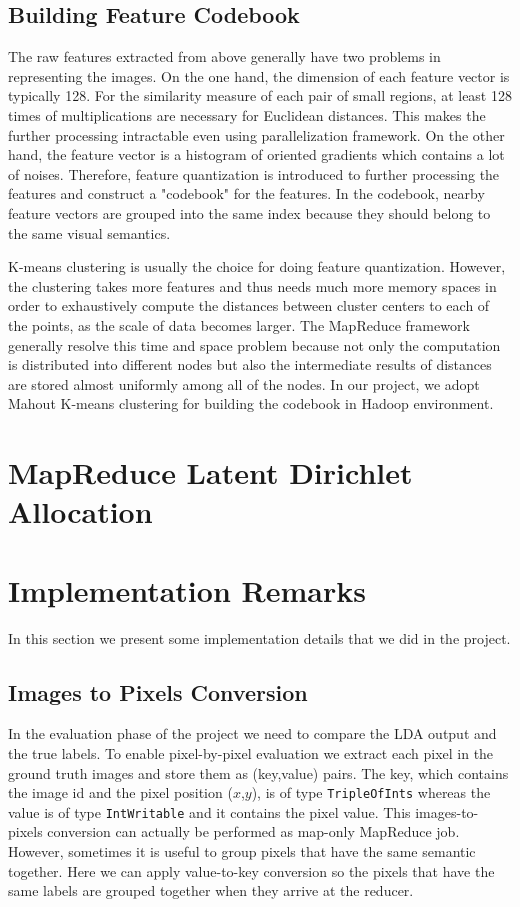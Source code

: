 \documentclass{sig-alternate}
\begin{document}
\subsection{Building Feature Codebook}
The raw features extracted from above generally have two problems in representing the images. On the one hand, the dimension of each feature vector is typically 128. For the similarity measure of each pair of small regions, at least 128 times of multiplications are necessary for Euclidean distances. This makes the further processing intractable even using parallelization framework. On the other hand, the feature vector is a histogram of oriented gradients which contains a lot of noises. Therefore, feature quantization is introduced to further processing the features and construct a "codebook" for the features. In the codebook, nearby feature vectors are grouped into the same index because they should belong to the same visual semantics.

K-means clustering is usually the choice for doing feature quantization. However, the clustering takes more features and thus needs much more memory spaces in order to exhaustively compute the distances between cluster centers to each of the points, as the scale of data becomes larger. The MapReduce framework generally resolve this time and space problem because not only the computation is distributed into different nodes but also the intermediate results of distances are stored almost uniformly among all of the nodes. In our project, we adopt Mahout K-means clustering \cite{mahout} for building the codebook in Hadoop environment.
\section{MapReduce Latent Dirichlet Allocation}\label{sec:mrlda}
\cite{mrlda}

\section{Implementation Remarks}\label{sec:impl}
In this section we present some implementation details that we did in the project.
\subsection{Images to Pixels Conversion}
In the evaluation phase of the project we need to compare the LDA output and the true labels. To enable pixel-by-pixel evaluation we extract each pixel in the ground truth images and store them as (key,value) pairs. The key, which contains the image id and the pixel position ($x$,$y$), is of type \texttt{TripleOfInts} whereas the value is of type \texttt{IntWritable} and it contains the pixel value. This images-to-pixels conversion can actually be performed as map-only MapReduce job. However, sometimes it is useful to group pixels that have the same semantic together. Here we can apply value-to-key conversion so the pixels that have the same labels are grouped together when they arrive at the reducer.
\end{document}
